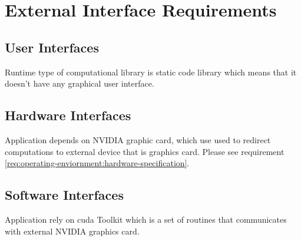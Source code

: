
\chapter{External Interface Requirements} \label{chp:external-interface-requirements}

\section{User Interfaces}
	\begin{comment}
		$<$Describe the logical characteristics of each interface between the software 
		product and the users. This may include sample screen images, any GUI standards 
		or product family style guides that are to be followed, screen layout 
		constraints, standard buttons and functions (e.g., help) that will appear on 
		every screen, keyboard shortcuts, error message display standards, and so on.  
		Define the software components for which a user interface is needed. Details of 
		the user interface design should be documented in a separate user interface 
		specification.$>$
	\end{comment}
	Runtime type of computational library is static code library which means that it doesn't have any graphical user interface.
\section{Hardware Interfaces}
	\begin{comment}
		$<$Describe the logical and physical characteristics of each interface between 
		the software product and the hardware components of the system. This may include 
		the supported device types, the nature of the data and control interactions 
		between the software and the hardware, and communication protocols to be 
		used.$>$
	\end{comment}
	Application depends on NVIDIA graphic card, which use used to redirect computations to external device that is graphics card. Please see requirement \ref{req:operating-enviornment:hardware-specification}.
\section{Software Interfaces}
	\begin{comment}
		$<$Describe the connections between this product and other specific software 
		components (name and version), including databases, operating systems, tools, 
		libraries, and integrated commercial components. Identify the data items or 
		messages coming into the system and going out and describe the purpose of each.  
		Describe the services needed and the nature of communications. Refer to 
		documents that describe detailed application programming interface protocols.  
		Identify data that will be shared across software components. If the data 
		sharing mechanism must be implemented in a specific way (for example, use of a 
		global data area in a multitasking operating system), specify this as an 
		implementation constraint.$>$
	\end{comment}
	Application rely on \gls{cuda} Toolkit which is a set of routines that communicates with external NVIDIA graphics card.
